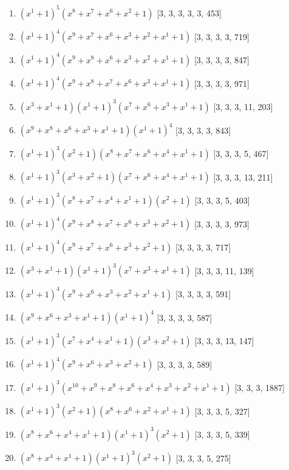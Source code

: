 \documentclass[10pt,twocolumn]{article}
\begin{document}
\begin{enumerate}
\item $(x^{1} + 1)^{5}(x^{8} + x^{7} + x^{6} + x^{2} + 1)$  [3, 3, 3, 3, 3, 453]
\item $(x^{1} + 1)^{4}(x^{9} + x^{7} + x^{6} + x^{3} + x^{2} + x^{1} + 1)$  [3, 3, 3, 3, 719]
\item $(x^{1} + 1)^{4}(x^{9} + x^{8} + x^{6} + x^{3} + x^{2} + x^{1} + 1)$  [3, 3, 3, 3, 847]
\item $(x^{1} + 1)^{4}(x^{9} + x^{8} + x^{7} + x^{6} + x^{3} + x^{1} + 1)$  [3, 3, 3, 3, 971]
\item $(x^{3} + x^{1} + 1)(x^{1} + 1)^{3}(x^{7} + x^{6} + x^{3} + x^{1} + 1)$  [3, 3, 3, 11, 203]
\item $(x^{9} + x^{8} + x^{6} + x^{3} + x^{1} + 1)(x^{1} + 1)^{4}$  [3, 3, 3, 3, 843]
\item $(x^{1} + 1)^{3}(x^{2} + 1)(x^{8} + x^{7} + x^{6} + x^{4} + x^{1} + 1)$  [3, 3, 3, 5, 467]
\item $(x^{1} + 1)^{3}(x^{3} + x^{2} + 1)(x^{7} + x^{6} + x^{4} + x^{1} + 1)$  [3, 3, 3, 13, 211]
\item $(x^{1} + 1)^{3}(x^{8} + x^{7} + x^{4} + x^{1} + 1)(x^{2} + 1)$  [3, 3, 3, 5, 403]
\item $(x^{1} + 1)^{4}(x^{9} + x^{8} + x^{7} + x^{6} + x^{3} + x^{2} + 1)$  [3, 3, 3, 3, 973]
\item $(x^{1} + 1)^{4}(x^{9} + x^{7} + x^{6} + x^{3} + x^{2} + 1)$  [3, 3, 3, 3, 717]
\item $(x^{3} + x^{1} + 1)(x^{1} + 1)^{3}(x^{7} + x^{3} + x^{1} + 1)$  [3, 3, 3, 11, 139]
\item $(x^{1} + 1)^{4}(x^{9} + x^{6} + x^{3} + x^{2} + x^{1} + 1)$  [3, 3, 3, 3, 591]
\item $(x^{9} + x^{6} + x^{3} + x^{1} + 1)(x^{1} + 1)^{4}$  [3, 3, 3, 3, 587]
\item $(x^{1} + 1)^{3}(x^{7} + x^{4} + x^{1} + 1)(x^{3} + x^{2} + 1)$  [3, 3, 3, 13, 147]
\item $(x^{1} + 1)^{4}(x^{9} + x^{6} + x^{3} + x^{2} + 1)$  [3, 3, 3, 3, 589]
\item $(x^{1} + 1)^{3}(x^{10} + x^{9} + x^{8} + x^{6} + x^{4} + x^{3} + x^{2} + x^{1} + 1)$  [3, 3, 3, 1887]
\item $(x^{1} + 1)^{3}(x^{2} + 1)(x^{8} + x^{6} + x^{2} + x^{1} + 1)$  [3, 3, 3, 5, 327]
\item $(x^{8} + x^{6} + x^{4} + x^{1} + 1)(x^{1} + 1)^{3}(x^{2} + 1)$  [3, 3, 3, 5, 339]
\item $(x^{8} + x^{4} + x^{1} + 1)(x^{1} + 1)^{3}(x^{2} + 1)$  [3, 3, 3, 5, 275]

\end{enumerate}
\end{document}
